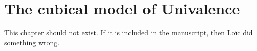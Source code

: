 \setchapterpreamble[u]{\margintoc}
\chapter{The cubical model of Univalence}

This chapter should not exist. If it is included in the manuscript, then Loïc did something wrong.
